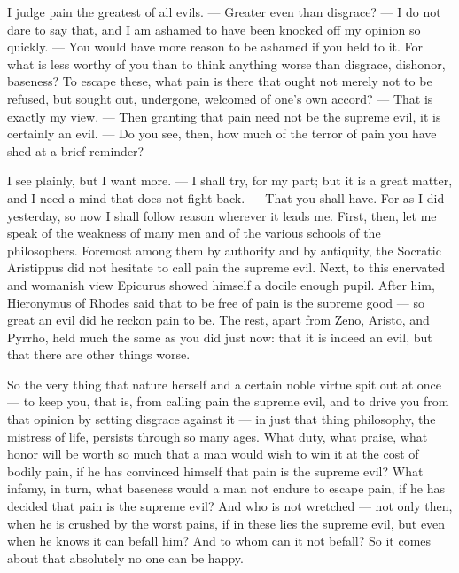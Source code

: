  I judge pain the greatest of all evils. — Greater even than disgrace? — I do not dare to say that, and I am ashamed to have been knocked off my opinion so quickly. — You would have more reason to be ashamed if you held to it. For what is less worthy of you than to think anything worse than disgrace, dishonor, baseness? To escape these, what pain is there that ought not merely not to be refused, but sought out, undergone, welcomed of one's own accord? — That is exactly my view. — Then granting that pain need not be the supreme evil, it is certainly an evil. — Do you see, then, how much of the terror of pain you have shed at a brief reminder?

 I see plainly, but I want more. — I shall try, for my part; but it is a great matter, and I need a mind that does not fight back. — That you shall have. For as I did yesterday, so now I shall follow reason wherever it leads me. First, then, let me speak of the weakness of many men and of the various schools of the philosophers. Foremost among them by authority and by antiquity, the Socratic Aristippus did not hesitate to call pain the supreme evil. Next, to this enervated and womanish view Epicurus showed himself a docile enough pupil. After him, Hieronymus of Rhodes said that to be free of pain is the supreme good — so great an evil did he reckon pain to be. The rest, apart from Zeno, Aristo, and Pyrrho, held much the same as you did just now: that it is indeed an evil, but that there are other things worse.

 So the very thing that nature herself and a certain noble virtue spit out at once — to keep you, that is, from calling pain the supreme evil, and to drive you from that opinion by setting disgrace against it — in just that thing philosophy, the mistress of life, persists through so many ages. What duty, what praise, what honor will be worth so much that a man would wish to win it at the cost of bodily pain, if he has convinced himself that pain is the supreme evil? What infamy, in turn, what baseness would a man not endure to escape pain, if he has decided that pain is the supreme evil? And who is not wretched — not only then, when he is crushed by the worst pains, if in these lies the supreme evil, but even when he knows it can befall him? And to whom can it not befall? So it comes about that absolutely no one can be happy.

